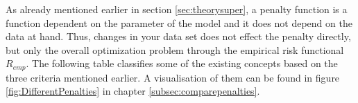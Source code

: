 \documentclass[12pt,a4paper]{article}
\begin{document}
\begin{center}
\end{center}

As already mentioned earlier in section \ref{sec:theorysuper}, a penalty function is a function dependent on the parameter of the model and it does not depend on the data at hand. Thus, changes in your data set does not effect the penalty directly, but only the overall optimization problem through the empirical risk functional $R_{emp}$. The following table classifies some of the existing concepts based on the three criteria mentioned earlier. A visualisation of them can be found in figure \ref{fig:DifferentPenalties} in chapter \ref{subsec:comparepenalties}.\\
\end{document}
